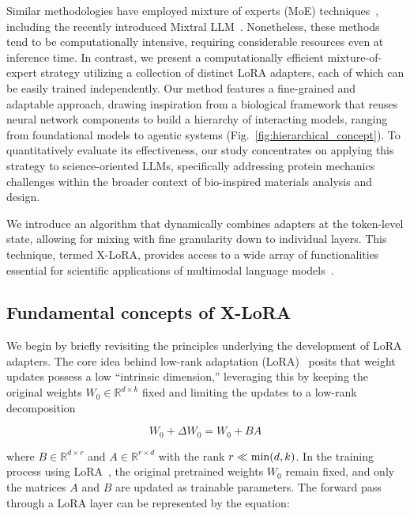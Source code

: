 Similar methodologies have employed mixture of experts (MoE) techniques~\cite{Jacobs1991AdaptiveExperts,Hampshire1992TheRecognition,Jordan1994HierarchicalAlgorithm}, including the recently introduced Mixtral LLM~\cite{Jiang2024MixtralExperts}. Nonetheless, these methods tend to be computationally intensive, requiring considerable resources even at inference time. In contrast, we present a computationally efficient mixture-of-expert strategy utilizing a collection of distinct LoRA adapters, each of which can be easily trained independently. Our method features a fine-grained and adaptable approach, drawing inspiration from a biological framework that reuses neural network components to build a hierarchy of interacting models, ranging from foundational models to agentic systems (Fig.~\ref{fig:hierarchical_concept}). To quantitatively evaluate its effectiveness, our study concentrates on applying this strategy to science-oriented LLMs, specifically addressing protein mechanics challenges within the broader context of bio-inspired materials analysis and design.

We introduce an algorithm that dynamically combines adapters at the token-level state, allowing for mixing with fine granularity down to individual layers. This technique, termed X-LoRA, provides access to a wide array of functionalities essential for scientific applications of multimodal language models~\cite{Hu2023DeepScience,Buehler2023AMetamaterials,Buehler2022ProteinNetworks,}. 

\subsection{Fundamental concepts of X-LoRA}

We begin by briefly revisiting the principles underlying the development of LoRA adapters. The core idea behind low-rank adaptation (LoRA)~\cite{hu2021lora} posits that weight updates possess a low “intrinsic dimension,” leveraging this by keeping the original weights $W_0 \in \mathbb{R}^{d \times k}$ fixed and limiting the updates to a low-rank decomposition

\begin{equation}
W_0 + \Delta W_0 = W_0 + BA 
\end{equation}

where $B \in \mathbb{R}^{d \times r}$ and $A \in \mathbb{R}^{r \times d}$ with the rank $r \ll {\rm min}(d,k)$. In the training process using LoRA~\cite{hu2021lora}, the original pretrained weights $W_0$ remain fixed, and only the matrices $A$ and $B$ are updated as trainable parameters. The forward pass through a LoRA layer can be represented by the equation:

